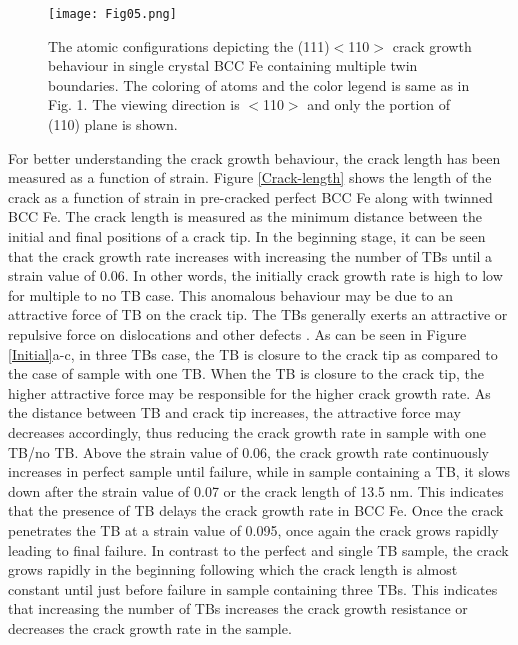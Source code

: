 \documentclass[smallextended]{svjour3}       %
\renewcommand\hl[1]{#1}
\begin{document}
\begin{figure}[h]
\centering
\texttt{[image: Fig05.png]}
\caption {\small The atomic configurations depicting the (111)$<$110$>$ crack growth behaviour in single crystal BCC Fe containing 
multiple twin boundaries. \hl{The coloring of atoms and the color legend is same as in Fig. 1. The viewing direction is $<$110$>$ and 
only the portion of (110) plane is shown.}}
\label{3-TB}
\end{figure}

For better understanding the crack growth behaviour, the crack length has been measured as a function of strain. Figure 
\ref{Crack-length} shows the length of the crack as a function of strain in pre-cracked perfect BCC Fe along with twinned 
BCC Fe. \hl{The crack length is measured as the minimum distance between the initial and final positions of a crack tip}.
\hl{In the beginning stage, it can be seen that the crack growth rate increases with increasing the number of TBs until a 
strain value of 0.06. In other words, the initially crack growth rate is high to low for multiple to no TB case. This 
anomalous behaviour may be due to an attractive force of TB on the crack tip. The TBs generally exerts an attractive or 
repulsive force on dislocations and other defects \mbox{\cite{chen2007repulsive,deng2010repulsive,guo2011repulsive,sainath2021role}}.  
As can be seen in Figure \mbox{\ref{Initial}a-c}, in three TBs case, the TB is closure to the crack tip as compared to the 
case of sample with one TB. When the TB is closure to the crack tip, the higher attractive force may be responsible for the  
higher crack growth rate. As the distance between TB and crack tip increases, the attractive force may decreases accordingly, 
thus reducing the crack growth rate in sample with one TB/no TB}. Above the strain value of 0.06, the crack growth rate 
continuously increases in perfect sample until failure, while in sample containing a TB, it slows down \hl{after the strain 
value of 0.07 or the crack length of 13.5 nm}. This indicates that the presence of TB delays the crack growth rate in BCC Fe. 
Once the crack penetrates the TB \hl{at a strain value of 0.095}, once again the crack grows rapidly leading to final failure. 
In contrast to the perfect and single TB sample, the crack grows rapidly in the beginning following which the crack length is 
almost constant until just before failure in sample containing three TBs. This indicates that increasing the number of TBs 
increases the crack growth resistance or decreases the crack growth rate in the sample. 
\end{document}
